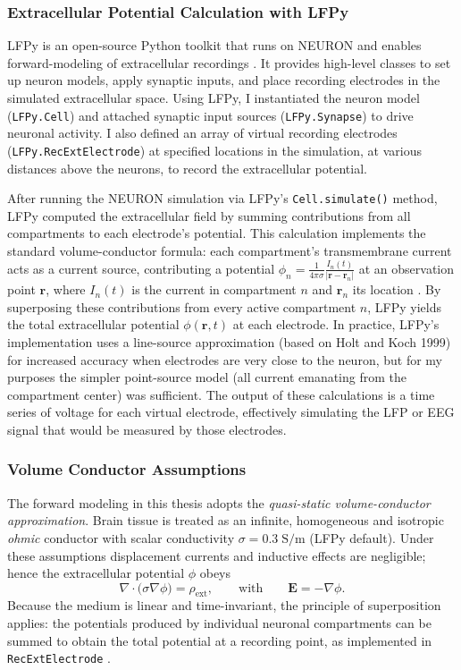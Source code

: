 \documentclass[final, a4paper,masters,en,listoffigures,listoftables,norwegiandates]{NMBU}
\begin{document}
\subsubsection{Extracellular Potential Calculation with LFPy}
LFPy is an open-source Python toolkit that runs on NEURON and enables forward-modeling of extracellular recordings \cite{Linden2014}. It provides high-level classes to set up neuron models, apply synaptic inputs, and place recording electrodes in the simulated extracellular space. Using LFPy, I instantiated the neuron model (\texttt{LFPy.Cell}) and attached synaptic input sources (\texttt{LFPy.Synapse}) to drive neuronal activity. I also defined an array of virtual recording electrodes (\texttt{LFPy.RecExtElectrode}) at specified locations in the simulation, at various distances above the neurons, to record the extracellular potential.

After running the NEURON simulation via LFPy’s \texttt{Cell.simulate()} method, LFPy computed the extracellular field by summing contributions from all compartments to each electrode’s potential. This calculation implements the standard volume-conductor formula: each compartment’s transmembrane current acts as a current source, contributing a potential $\phi_n = \frac{1}{4\pi\sigma}\frac{I_n(t)}{|\mathbf{r}-\mathbf{r}_n|}$ at an observation point $\mathbf{r}$, where $I_n(t)$ is the current in compartment $n$ and $\mathbf{r}_n$ its location \cite{Linden2014}. By superposing these contributions from every active compartment $n$, LFPy yields the total extracellular potential $\phi(\mathbf{r},t)$ at each electrode. In practice, LFPy’s implementation uses a line-source approximation (based on Holt and Koch 1999\cite{Holt1999}) for increased accuracy when electrodes are very close to the neuron, but for my purposes the simpler point-source model (all current emanating from the compartment center) was sufficient. The output of these calculations is a time series of voltage for each virtual electrode, effectively simulating the LFP or EEG signal that would be measured by those electrodes.

\subsubsection{Volume Conductor Assumptions}
The forward modeling in this thesis adopts the \emph{quasi-static volume-conductor approximation}. 
Brain tissue is treated as an infinite, homogeneous and isotropic \emph{ohmic} conductor with scalar conductivity $\sigma = 0.3\;\mathrm{S/m}$ (LFPy default). Under these assumptions displacement currents and inductive effects are negligible; hence the extracellular potential $\phi$ obeys
\begin{equation}
  \nabla\!\cdot\!\bigl(\sigma\nabla\phi\bigr) = \rho_{\text{ext}}, 
  \qquad\text{with}\qquad
  \mathbf{E} = -\nabla\phi .
  \label{eq:quasistatic}
\end{equation}
Because the medium is linear and time-invariant, the principle of superposition applies: 
the potentials produced by individual neuronal compartments can be summed to obtain the total potential at a recording point, as implemented in \texttt{RecExtElectrode} \cite{PlonseyHeppner1967,Hamalainen1993}.
\end{document}
